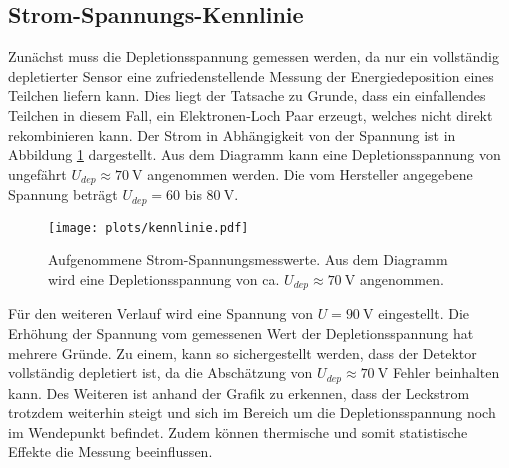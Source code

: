 \subsection{Strom-Spannungs-Kennlinie}
\label{sec:kennlinie}

Zunächst muss die Depletionsspannung gemessen werden, da nur ein vollständig 
depletierter Sensor eine zufriedenstellende Messung der Energiedeposition 
eines Teilchen liefern kann. Dies liegt der Tatsache zu Grunde, dass ein 
einfallendes Teilchen in diesem Fall, ein Elektronen-Loch Paar erzeugt, welches 
nicht direkt rekombinieren kann. Der Strom in Abhängigkeit von der Spannung ist 
in Abbildung \ref{fig:kennlinie} dargestellt. Aus dem Diagramm kann eine 
Depletionsspannung von ungefährt $U_{dep} \approx \SI{70}{\volt}$ 
angenommen werden. Die vom Hersteller angegebene Spannung beträgt 
$U_{dep} = 60$ bis $\SI{80}{\volt}$.

\begin{figure}[H]
  \centering
  \texttt{[image: plots/kennlinie.pdf]}
  \caption{Aufgenommene Strom-Spannungsmesswerte. Aus dem Diagramm wird eine 
  Depletionsspannung von ca. $U_{dep} \approx \SI{70}{\volt}$ angenommen.}
  \label{fig:kennlinie}
\end{figure}

Für den weiteren Verlauf wird eine Spannung von 
$U = \SI{90}{\volt}$ eingestellt. Die Erhöhung der Spannung vom gemessenen 
Wert der Depletionsspannung hat mehrere Gründe. Zu einem, kann so sichergestellt 
werden, dass der Detektor vollständig depletiert ist, da die 
Abschätzung von $U_{dep} \approx \SI{70}{\volt}$ Fehler beinhalten kann. 
Des Weiteren ist anhand der Grafik zu erkennen, dass der Leckstrom 
trotzdem weiterhin steigt und sich im Bereich um die Depletionsspannung 
noch im Wendepunkt befindet. Zudem können thermische und somit statistische 
Effekte die Messung beeinflussen.